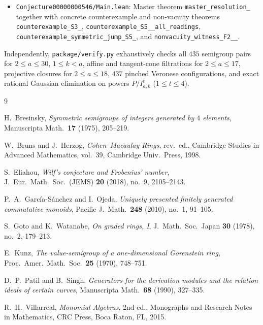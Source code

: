 \documentclass[11pt]{amsart}
\theoremstyle{definition}
\theoremstyle{remark}
\begin{document}
{\begin{itemize}
  \item \texttt{Conjecture00000000546/\allowbreak Main.lean}: Master theorem \texttt{master\_\allowbreak resolution\_} together with concrete counterexample and non-vacuity theorems \texttt{counterexample\_\allowbreak S3\_}, \texttt{counterexample\_\allowbreak S5\_\_\allowbreak all\_\allowbreak readings}, \texttt{counterexample\_\allowbreak symmetric\_\allowbreak jump\_\allowbreak S5\_}, and \texttt{nonvacuity\_\allowbreak witness\_\allowbreak F2\_\_}.
\end{itemize}
Independently, \texttt{package/verify.py} exhaustively checks all $435$ semigroup pairs for $2 \le a \le 30$, $1 \le k < a$, affine and tangent-cone filtrations for $2 \le a \le 17$, projective closures for $2 \le a \le 18$, $437$ pinched Veronese configurations, and exact rational Gaussian elimination on powers $P / I_{a,k}^t$ ($1 \le t \le 4$).
\par}

\begin{thebibliography}{9}

H.~Bresinsky, \emph{Symmetric semigroups of integers generated by $4$ elements}, Manuscripta Math.\ \textbf{17} (1975), 205--219.

W.~Bruns and J.~Herzog, \emph{Cohen--Macaulay Rings}, rev.\ ed., Cambridge Studies in Advanced Mathematics, vol.~39, Cambridge Univ.\ Press, 1998.

S.~Eliahou, \emph{Wilf's conjecture and Frobenius' number}, J.\ Eur.\ Math.\ Soc.\ (JEMS) \textbf{20} (2018), no.~9, 2105--2143.

P.~A.~Garc\'ia-S\'anchez and I.~Ojeda, \emph{Uniquely presented finitely generated commutative monoids}, Pacific J.\ Math.\ \textbf{248} (2010), no.~1, 91--105.

S.~Goto and K.~Watanabe, \emph{On graded rings, I}, J.\ Math.\ Soc.\ Japan \textbf{30} (1978), no.~2, 179--213.

E.~Kunz, \emph{The value-semigroup of a one-dimensional Gorenstein ring}, Proc.\ Amer.\ Math.\ Soc.\ \textbf{25} (1970), 748--751.

D.~P.~Patil and B.~Singh, \emph{Generators for the derivation modules and the relation ideals of certain curves}, Manuscripta Math.\ \textbf{68} (1990), 327--335.

R.~H.~Villarreal, \emph{Monomial Algebras}, 2nd ed., Monographs and Research Notes in Mathematics, CRC Press, Boca Raton, FL, 2015.

\end{thebibliography}
\end{document}
